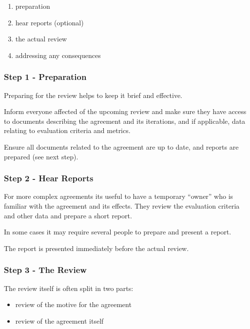 \begin{enumerate}
\item preparation

\item hear reports (optional)

\item the actual review

\item addressing any consequences

\end{enumerate}

\subsubsection{Step 1 - Preparation}
\label{step1-preparation}

Preparing for the review helps to keep it brief and effective.

Inform everyone affected of the upcoming review and make sure they have access to documents describing the agreement and its iterations, and if applicable, data relating to evaluation criteria and metrics.

Ensure all documents related to the agreement are up to date, and reports are prepared (see next step).

\subsubsection{Step 2 - Hear Reports}
\label{step2-hearreports}

For more complex agreements its useful to have a temporary ``owner'' who is familiar with the agreement and its effects. They review the evaluation criteria and other data and prepare a short report.

In some cases it may require several people to prepare and present a report.

The report is presented immediately before the actual review.

\subsubsection{Step 3 - The Review}
\label{step3-thereview}

The review itself is often split in two parts:

\begin{itemize}
\item review of the motive for the agreement

\item review of the agreement itself

\end{itemize}

